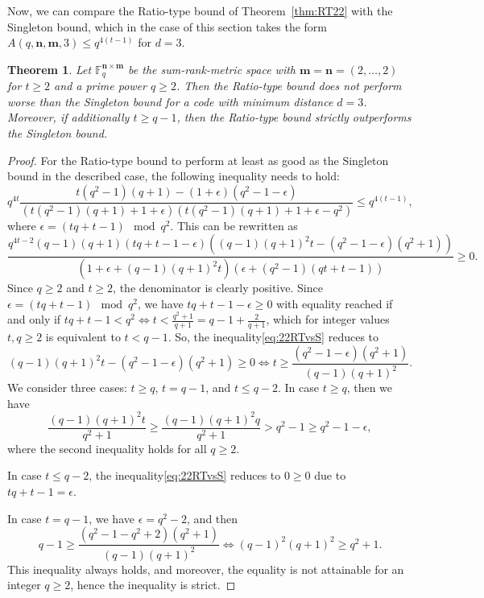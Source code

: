 \documentclass[a4paper]{article}
\newtheorem{theorem}[formula]{Theorem}
\newcommand{\F}{\mathbb{F}}
\newcommand{\bfn}{\mathbf {n}}
\newcommand{\bfm}{\mathbf {m}}
\newcommand{\spac}{\F^{\bfn\times\bfm}_q}
\begin{document}
Now, we can compare the Ratio-type bound of Theorem~\ref{thm:RT22} with the Singleton bound, which in the case of this section takes the form $A(q,\bfn,\bfm,3)\leq q^{4(t-1)}$ for $d=3$.

\begin{theorem}
    Let $\spac$ be the sum-rank-metric space with $\bfm=\bfn=(2,\dots,2)$ for $t\geq2$ and a prime power $q\geq2$. Then the Ratio-type bound does not perform worse than the Singleton bound for a code with minimum distance $d=3$. Moreover, if additionally $t\geq q-1$, then the Ratio-type bound strictly outperforms the Singleton bound.
\end{theorem}


\begin{proof}
    For the Ratio-type bound to perform at least as good as the Singleton bound in the described case, the following inequality needs to hold:
    $$q^{4t}\frac{t(q^2-1)(q+1)-(1+\epsilon)(q^2-1-\epsilon)}{(t(q^2-1)(q+1)+1+\epsilon)(t(q^2-1)(q+1)+1+\epsilon-q^2)}\leq q^{4(t-1)},$$
where $\epsilon=(tq+t-1)\mod q^2$. This can be rewritten as
{\footnotesize{
\begin{equation}\label{eq:22RTvsS}
    \frac{q^{4t-2}(q-1)(q+1) (tq+t-1 - \epsilon) ( (q-1)(q+1)^2 t-(q^2-1-\epsilon)(q^2+1))}{(1+    \epsilon + (q-1) (q+1)^2 t) (\epsilon + (q^2-1) (qt+t-1))} \geq 0.
\end{equation}
}}
Since $q\geq 2$ and $t\geq 2$, the denominator is clearly positive. Since $\epsilon = (tq+t-1)\mod q^2$, we have $tq+t-1 - \epsilon\geq0$ with equality reached if and only if $tq+t-1 < q^2 \Leftrightarrow t < \frac{q^2+1}{q+1}=q-1+\frac2{q+1}$, which for integer values $t,q\geq2$ is equivalent to $t< q-1$. So, the inequality\:\eqref{eq:22RTvsS} reduces to
$$(q-1)(q+1)^2 t-(q^2-1-\epsilon)(q^2+1)\geq0\Leftrightarrow t\geq \frac{(q^2-1-\epsilon)(q^2+1)}{(q-1)(q+1)^2}.$$
We consider three cases: $t\geq q$, $t=q-1$, and $t\leq q-2$. In case $t\geq q$, then we have
$$
\frac{(q-1)(q+1)^2t}{q^2+1}\geq \frac{(q-1)(q+1)^2q}{q^2+1}> q^2-1\geq q^2-1-\epsilon,
$$
where the second inequality holds for all $q\geq 2$.

In case $t\leq q-2$, the inequality\:\eqref{eq:22RTvsS} reduces to $0\geq 0$ due to $tq+t-1=\epsilon$.

In case $t= q-1$, we have $\epsilon = q^2-2$, and then
$$q-1\geq \frac{(q^2-1-q^2+2)(q^2+1)}{(q-1)(q+1)^2} \Leftrightarrow (q-1)^2(q+1)^2\geq q^2+1.$$
This inequality always holds, and moreover, the equality is not attainable for an integer $q\geq2$, hence the inequality is strict.
\end{proof}
\end{document}
